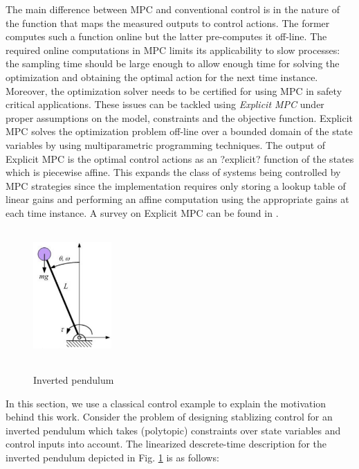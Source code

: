  The main difference between MPC and conventional control is in the nature of the function that maps the measured outputs to control actions. The former computes such a function online but the latter pre-computes it off-line. The required online computations in MPC limits its applicability to slow processes: the sampling time should be large enough to allow enough time for solving the optimization and obtaining the optimal action for the next time instance. Moreover, the optimization solver needs to be certified for using MPC in safety critical applications.
These issues can be tackled using \emph{Explicit MPC} under proper assumptions on the model, constraints and the objective function. Explicit MPC solves the optimization problem off-line over a bounded domain of the state variables by using multiparametric programming techniques. The output of Explicit MPC is the optimal control actions as an ?explicit? function of the states which is piecewise affine. This expands the class of systems being controlled by MPC strategies since the implementation requires only storing a lookup table of linear gains and performing an affine computation using the appropriate gains at each time instance. A survey on Explicit MPC can be found in \cite{Alessio2009}.\\
\begin{figure}[t]
	\includegraphics[width=3cm,height=5cm]{Figs/inv_pend.png}
	\label{fig:inverted_pendulum}
	\caption{Inverted pendulum}
\end{figure}
In this section, we use a classical control example to explain the motivation behind this work. Consider the problem of designing stablizing control for an inverted pendulum which takes (polytopic) constraints over state variables and control inputs into account. The linearized descrete-time description for the inverted pendulum depicted in Fig. \ref{fig:inverted_pendulum} is as follows:
